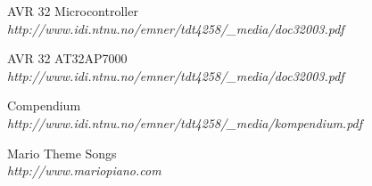 \renewcommand{\refname} {References}
\begin{thebibliography}{15}  %
 AVR 32 Microcontroller\\
	\emph{http://www.idi.ntnu.no/emner/tdt4258/\_media/doc32003.pdf}

 AVR 32 AT32AP7000\\
	\emph{http://www.idi.ntnu.no/emner/tdt4258/\_media/doc32003.pdf}

 Compendium\\
	\emph{http://www.idi.ntnu.no/emner/tdt4258/\_media/kompendium.pdf}

 Mario Theme Songs\\
	\emph{http://www.mariopiano.com}

\end{thebibliography}
